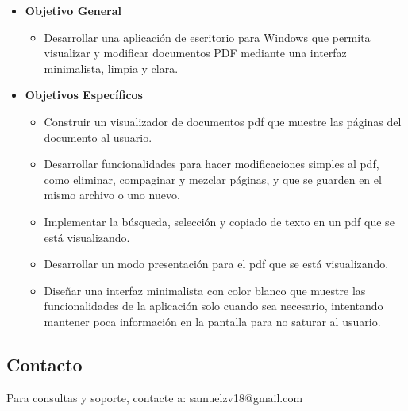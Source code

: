 




\begin{itemize}
    \item \textbf{Objetivo General}
    \begin{itemize}
        \item Desarrollar una aplicación de escritorio para Windows que
        permita visualizar y modificar documentos PDF mediante una interfaz minimalista, limpia y clara.
    \end{itemize}
    \item \textbf{Objetivos Específicos}
    \begin{itemize}
        \item Construir un visualizador de documentos pdf que muestre las páginas del documento al usuario.
        \item Desarrollar funcionalidades para hacer modificaciones simples al pdf, como eliminar, compaginar y mezclar páginas, y que se guarden en el mismo archivo o uno nuevo.
        \item Implementar la búsqueda, selección y copiado de texto en un pdf que se está visualizando.
        \item Desarrollar un modo presentación para el pdf que se está visualizando.
        \item Diseñar una interfaz minimalista con color blanco que muestre las funcionalidades de la aplicación solo cuando sea necesario, intentando mantener poca información en la pantalla para no saturar al usuario.
    \end{itemize}
\end{itemize}

\subsection{Contacto}
Para consultas y soporte, contacte a: samuelzv18@gmail.com

